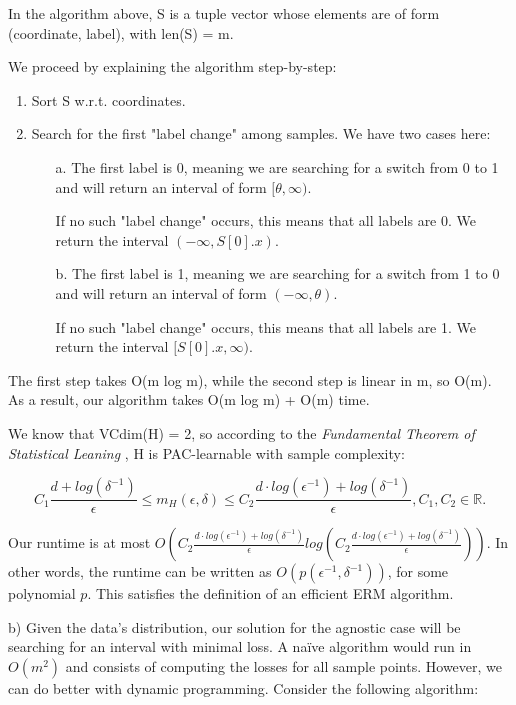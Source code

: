 \documentclass{article}
\newcommand{\<}{\langle}
\renewcommand{\>}{\rangle}
\theoremstyle{definition}
\begin{document}
In the algorithm above, S is a tuple vector whose elements are of form (coordinate, label), with len(S) = m. 

We proceed by explaining the algorithm step-by-step:

\begin{enumerate}
    \item Sort S w.r.t. coordinates.
    \item Search for the first "label change" among samples. We have two cases here:
    \begin{enumerate}
        \item[a.] The first label is 0, meaning we are searching for a switch from 0 to 1 and will return an interval of form $[\theta, \infty)$. 
        
        If no such "label change" occurs, this means that all labels are 0. We return the interval $(-\infty, S[0].x)$.
        
        \item[b.] The first label is 1, meaning we are searching for a switch from 1 to 0 and will return an interval of form $(-\infty, \theta)$.
        
        If no such "label change" occurs, this means that all labels are 1. We return the interval $[S[0].x, \infty)$.
    \end{enumerate}
\end{enumerate}

The first step takes O(m log m), while the second step is linear in m, so O(m). As a result, our algorithm takes O(m log m) + O(m) time. 

We know that VCdim(H) = 2, so according to the \textit{Fundamental Theorem of Statistical Leaning} \cite{SS}, H is PAC-learnable with sample complexity:

$$C_1\frac{d+ log(\delta^{-1})}{\epsilon} \leq m_H(\epsilon, \delta) \leq C_2 \frac{d \cdot log(\epsilon^{-1})+log(\delta^{-1})}{\epsilon}, C_1, C_2 \in \mathbb{R}.$$

Our runtime is at most $O(C_2 \frac{d \cdot log(\epsilon^{-1})+log(\delta^{-1})}{\epsilon} log(C_2 \frac{d \cdot log(\epsilon^{-1})+log(\delta^{-1})}{\epsilon}))$. In other words, the runtime can be written as $O(p(\epsilon^{-1}, \delta^{-1}))$, for some polynomial $p$. This satisfies the definition of an efficient ERM algorithm.

\vspace{1mm}

b) Given the data's distribution, our solution for the agnostic case will be searching for an interval with minimal loss. A naïve algorithm would run in $O(m^2)$ and consists of computing the losses for all sample points. However, we can do better with dynamic programming. Consider the following algorithm:
\end{document}

